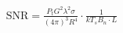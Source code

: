 \documentclass[preview]{standalone}
\begin{document}
\begin{align*}
\text{SNR} = \frac{P_t G^2 \lambda^2 \sigma}{(4 \pi)^3 R^4} \cdot \frac{1}{k T_s B_n \cdot L}
\end{align*}
\end{document}

